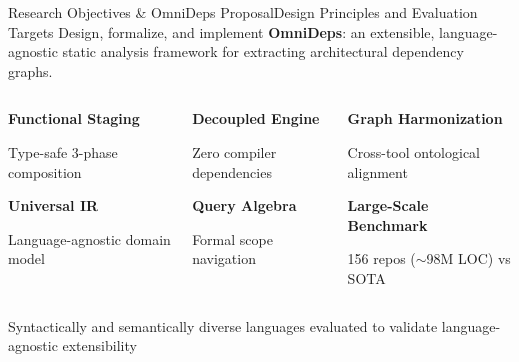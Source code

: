 \documentclass[aspectratio=169,10pt]{beamer}
\begin{document}
\begin{frame}{Research Objectives \& OmniDeps Proposal}{Design Principles and Evaluation Targets}
  \centering
  {\small Design, formalize, and implement \textbf{OmniDeps}: an extensible, language-agnostic static analysis framework for extracting architectural dependency graphs.}\par\vspace{0.6em}

  \begin{columns}[T,onlytextwidth]
      \begin{cookiecard}[title={Pipeline Formalization}]
        \footnotesize
        \textbf{Functional Staging}\par
        Type-safe 3-phase composition\par\vspace{0.12em}
        \textbf{Universal IR}\par
        Language-agnostic domain model\par
      \end{cookiecard}

      \begin{cookiecard}[title={Rust Implementation}]
        \footnotesize
        \textbf{Decoupled Engine}\par
        Zero compiler dependencies\par\vspace{0.12em}
        \textbf{Query Algebra}\par
        Formal scope navigation\par
      \end{cookiecard}

      \begin{cookiecard}[title={Empirical Evaluation}]
        \footnotesize
        \textbf{Graph Harmonization}\par
        Cross-tool ontological alignment\par\vspace{0.12em}
        \textbf{Large-Scale Benchmark}\par
        156 repos ($\sim$98M LOC) vs SOTA\par
      \end{cookiecard}
  \end{columns}

  \vspace{0.9em}
   \hspace{0.2em}
   \hspace{0.2em}
   \hspace{0.2em}
   \hspace{0.6em}
  {\scriptsize\color{cookieMuted} Syntactically and semantically diverse languages evaluated to validate language-agnostic extensibility\par}
\end{frame}
\end{document}
